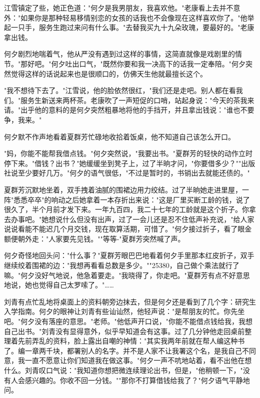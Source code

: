 \documentclass[UTF8]{ctexart}
\begin{document}
江雪镇定了些，她正色道："何夕是我男朋友，我喜欢他。"老康看上去并不意外："如果你是那种轻易移情别恋的女孩的话我也不会像现在这样喜欢你了。"他举起一只手，服务生跑过来问有什么事。"去替我买九十九朵玫瑰，要最好的。"老康拿出钱。

何夕剧烈地喘着气，他从严没有遇到过这样的事情，这简直就像是戏剧里的情节。"那好吧。"何夕吐出口气，"既然你要和我一决高下的话我一定奉陪。"何夕突然觉得这样的话说起来也是很顺口的，仿佛天生他就最擅长这个。

"我不想待下去了。"江雪说，他的脸依然很红，"我们还是走吧。别人都在看我们。"服务生新送来两杯茶。老康吹了一声短促的口哨，站起身说："今天的茶我来请。"出乎他的意料的是何夕突然粗暴地将他的手挡开，并且拿出钱说："谁也不要争，我来。"

何夕默不作声地看着夏群芳忙碌地收拾着饭桌，他不知道自己该怎么开口。

"妈，你能不能帮我借点钱。"何夕突然说，"我要出书。"夏群芳的轻快的动作立时停下来。"借钱？出书？"她缓缓坐到凳子上，过了半晌才问，"你要借多少？""出版社说至少要好几万。"何夕的语气很低，"不过是暂时的，书销出去就能还债的。"

夏群芳沉默地坐着，双手拽着油腻的围裙边用力绞结。过了半晌她走进里屋，一阵"悉悉卒卒"的响动之后她拿着一本存折出来说："这是厂里买断工龄的钱，说了很久了，半个月前才发下来。一年九百四，我二十七年的工龄就是这个折子。你拿去办事吧。"她想说什么但没有出声，过了一会儿还是忍不住低声补充说，"给人家说说看能不能迟几个月交钱，现在取算活期，可惜了。"何夕接过折子，看了眼金额便朝外走："人家要先见钱。""等等-"夏群芳突然喊了声。

何夕奇怪地回头问："什么事？"夏群芳眼巴巴地看着何夕手里那本红皮折子，双手继续绞着围裙的边："我想再看看总数是多少。""25380，自己做个乘法就行了嘛。"何夕没好气地说，他急着要走。"我晓得了，你走吧。"夏群芳有点不好意思地说，她也觉得自己太罗嗦了。"……

刘青有点忙乱地将桌面上的资料朝旁边抹去，但是何夕还是看到了几个字：研究生入学指南。何夕的眼神让刘青有些讪讪然，他轻声说："是帮朋友的忙。你先坐吧。"何夕没有落座的意思。"老师。"他低声开口说，"你能不能借点钱给我，我想自己出书。"刘青没有显得意外，似乎早知道会有这事。过了几分钟他走回桌前整理着先前弄乱的资料，脸上露出自嘲的神情："其实我两年前就在帮人编这种书了。编一章两千块，都署别人的名字。并不是人家不让我署这个名，是我自己不同意，我一直不愿意让你们知道我在做这事。"何夕一声不吭地站着，看不出他在想什么。刘青叹口气说："我知道你想把微连续理论出书，但是，"他稍顿一下，"没有人会感兴趣的。你收不回一分钱。""那你不打算借钱给我了？"何夕语气平静地问。

\clearpage
\end{document}
